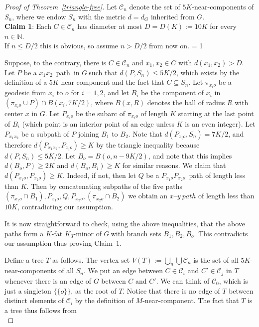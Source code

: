 \documentclass[a4paper]{article}
\newcommand{\Debug}{0}
\newcommand{\N}{\ensuremath{\mathbb N}}
\newcommand{\cc}{\ensuremath{\mathcal C}}
\newcommand{\pth}[2]{\ensuremath{#1}\text{--}\ensuremath{#2}~path}
\newcommand{\g}{\ensuremath{G\ }}
\newcommand{\Tr}[1]{Theorem~\ref{#1}}
\newcommand{\fe}{for every}
\newcommand{\mymargin}[1]{\ifnum \Debug = 1
  \marginpar{\begin{minipage}{\marginparwidth}\small \begin{flushleft}{\color{blue}#1}\end{flushleft}\end{minipage}}\fi
}
\begin{document}
\begin{proof}[Proof of \Tr{triangle-free}]
Let $\cc_n$ denote the set of  $5K$-near-components of $S_n$, where we endow $S_n$ with the metric $d=d_G$ inherited from $G$.\\

{\bf Claim 1}: Each $C\in \cc_n$ has diameter at most $D=D(K):= 10K$ \fe\ $n\in \N$.\\

If $n\leq D/2$ this is obvious, so assume $n> D/2$ from now on. \mymargin{This paragraph has been rewritten.}
Suppose, to the contrary, there is $C\in \cc_n$ and $x_1,x_2\in C$ with $d(x_1,x_2)>D$. Let $P$ be a \pth{x_1}{x_2}\ in \g such that $d(P,S_n)\leq 5K/2$, which exists by the definition of a $5K$-near-component and the fact that $C \subseteq S_n$. 
Let $\pi_{x_i o}$  be a geodesic from $x_i$ to $o$ for $i=1,2$, and let $B_i$ be the component of $x_i$ in $(\pi_{x_i o} \cup P) \cap B(x_i,7K/2)$, where $B(x,R)$ denotes the ball of radius $R$ with center $x$ in $G$. Let $P_{x_i o}$ be the subarc of $\pi_{x_i o}$ of length $K$ starting at the last point of $B_i$ (which point is an interior point of an edge unless $K$ is an even integer). Let $P_{x_1 x_2}$ be a subpath of $P$ joining $B_1$ to $B_2$. Note that $d(P_{x_i o}, S_n)=  7K/2$, and therefore 
$d(P_{x_1 x_2}, P_{x_i o})\geq K$ by the triangle inequality because $d(P,S_n)\leq 5K/2$. Let $B_o= B(o,n-9K/2)$, and note that this implies $d(B_o, P)\geq 2K$ and $d(B_o, B_i)\geq K$ for similar reasons.  We claim that $d(P_{x_1 o}, P_{x_2 o})\geq K$. Indeed, if not, then let $Q$ be a \pth{P_{x_1 o}}{P_{x_2 o}} of length less than $K$. Then by concatenating subpaths of the five paths $(\pi_{x_1 o} \cap B_1), P_{x_1 o}, Q, P_{x_2 o}, (\pi_{x_2 o} \cap B_2) $ we obtain an $\pth{x}{y}$ of length less than $10K$, contradicting our assumption. 

It is now  straightforward to check, using the above inequalities, that the above paths form a $K$-fat $K_3$-minor of \g with branch sets $B_1,B_2,B_o$. This contradicts our assumption thus proving Claim~1. 


\bigskip

Define a tree $T$ as follows. The vertex set  $V(T):= \bigcup_n  \bigcup \cc_n$ is the set of all $5K$-near-components of all $S_n$.
We put an edge between $C\in \cc_i$ and $C' \in \cc_j$ in $T$ whenever there is an edge of $G$ between $C$ and $C'$. We can think of $\cc_0$, which is just a singleton $\{\{o\}\}$, as the root of $T$. Notice that there is no edge of $T$ between distinct elements of $\cc_i$ by the definition of $M$-near-component. The fact that $T$ is a tree thus follows from\\


\end{proof}
\end{document}
